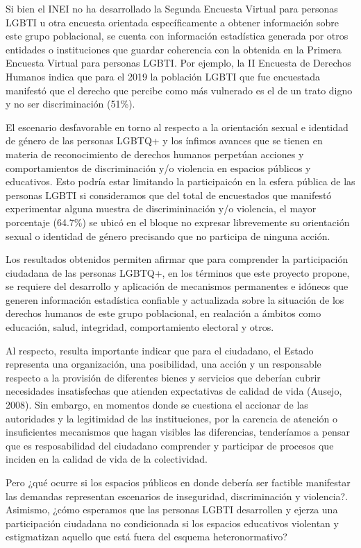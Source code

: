 \documentclass[
]{book}
\theoremstyle{definition}
\theoremstyle{definition}
\theoremstyle{definition}
\theoremstyle{definition}
\theoremstyle{remark}
\begin{document}
Si bien el INEI no ha desarrollado la Segunda Encuesta Virtual para personas LGBTI u otra encuesta orientada específicamente a obtener información sobre este grupo poblacional, se cuenta con información estadística generada por otros entidades o instituciones que guardar coherencia con la obtenida en la Primera Encuesta Virtual para personas LGBTI. Por ejemplo, la II Encuesta de Derechos Humanos indica que para el 2019 la población LGBTI que fue encuestada manifestó que el derecho que percibe como más vulnerado es el de un trato digno y no ser discriminación (51\%).

El escenario desfavorable en torno al respecto a la orientación sexual e identidad de género de las personas LGBTQ+ y los ínfimos avances que se tienen en materia de reconocimiento de derechos humanos perpetúan acciones y comportamientos de discriminación y/o violencia en espacios públicos y educativos. Esto podría estar limitando la participaicón en la esfera pública de las personas LGBTI si consideramos que del total de encuestados que manifestó experimentar alguna muestra de discrimininación y/o violencia, el mayor porcentaje (64.7\%) se ubicó en el bloque no expresar librevemente su orientación sexual o identidad de género precisando que no participa de ninguna acción.

Los resultados obtenidos permiten afirmar que para comprender la participación ciudadana de las personas LGBTQ+, en los términos que este proyecto propone, se requiere del desarrollo y aplicación de mecanismos permanentes e idóneos que generen información estadística confiable y actualizada sobre la situación de los derechos humanos de este grupo poblacional, en realación a ámbitos como educación, salud, integridad, comportamiento electoral y otros.

Al respecto, resulta importante indicar que para el ciudadano, el Estado representa una organización, una posibilidad, una acción y un responsable respecto a la provisión de diferentes bienes y servicios que deberían cubrir necesidades insatisfechas que atienden expectativas de calidad de vida (Ausejo, 2008). Sin embargo, en momentos donde se cuestiona el accionar de las autoridades y la legitimidad de las instituciones, por la carencia de atención o insuficientes mecanismos que hagan visibles las diferencias, tenderíamos a pensar que es resposabilidad del ciudadano comprender y participar de procesos que inciden en la calidad de vida de la colectividad.

Pero ¿qué ocurre si los espacios públicos en donde debería ser factible manifestar las demandas representan escenarios de inseguridad, discriminación y violencia?. Asimismo, ¿cómo esperamos que las personas LGBTI desarrollen y ejerza una participación ciudadana no condicionada si los espacios educativos violentan y estigmatizan aquello que está fuera del esquema heteronormativo?
\end{document}
